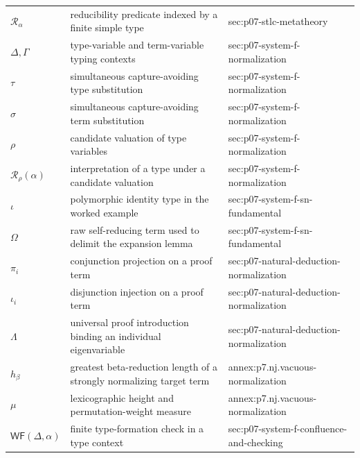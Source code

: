 \begin{longtable}{@{}p{}p{}p{}@{}}
\(\mathcal R_\alpha\) & reducibility predicate indexed by a finite simple type & sec:\allowbreak{}p07-\allowbreak{}stlc-\allowbreak{}metatheory \\
\(\Delta,\allowbreak \Gamma\) & type-variable and term-variable typing contexts & sec:\allowbreak{}p07-\allowbreak{}system-\allowbreak{}f-\allowbreak{}normalization \\
\(\tau\) & simultaneous capture-avoiding type substitution & sec:\allowbreak{}p07-\allowbreak{}system-\allowbreak{}f-\allowbreak{}normalization \\
\(\sigma\) & simultaneous capture-avoiding term substitution & sec:\allowbreak{}p07-\allowbreak{}system-\allowbreak{}f-\allowbreak{}normalization \\
\(\rho\) & candidate valuation of type variables & sec:\allowbreak{}p07-\allowbreak{}system-\allowbreak{}f-\allowbreak{}normalization \\
\(\mathcal R_\rho(\alpha)\) & interpretation of a type under a candidate valuation & sec:\allowbreak{}p07-\allowbreak{}system-\allowbreak{}f-\allowbreak{}normalization \\
\(\iota\) & polymorphic identity type in the worked example & sec:\allowbreak{}p07-\allowbreak{}system-\allowbreak{}f-\allowbreak{}sn-\allowbreak{}fundamental \\
\(\Omega\) & raw self-reducing term used to delimit the expansion lemma & sec:\allowbreak{}p07-\allowbreak{}system-\allowbreak{}f-\allowbreak{}sn-\allowbreak{}fundamental \\
\(\pi_i\) & conjunction projection on a proof term & sec:\allowbreak{}p07-\allowbreak{}natural-\allowbreak{}deduction-\allowbreak{}normalization \\
\(\iota_i\) & disjunction injection on a proof term & sec:\allowbreak{}p07-\allowbreak{}natural-\allowbreak{}deduction-\allowbreak{}normalization \\
\(\Lambda\) & universal proof introduction binding an individual eigenvariable & sec:\allowbreak{}p07-\allowbreak{}natural-\allowbreak{}deduction-\allowbreak{}normalization \\
\(h_\beta\) & greatest beta-reduction length of a strongly normalizing target term & annex:\allowbreak{}p7.\allowbreak{}nj.\allowbreak{}vacuous-\allowbreak{}normalization \\
\(\mu\) & lexicographic height and permutation-weight measure & annex:\allowbreak{}p7.\allowbreak{}nj.\allowbreak{}vacuous-\allowbreak{}normalization \\
\(\mathsf{WF}(\Delta,\allowbreak \alpha)\) & finite type-formation check in a type context & sec:\allowbreak{}p07-\allowbreak{}system-\allowbreak{}f-\allowbreak{}confluence-\allowbreak{}and-\allowbreak{}checking \\

\end{longtable}
